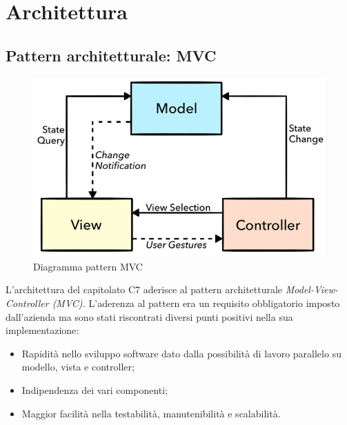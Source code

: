 \section{Architettura}
\subsection{Pattern architetturale: MVC}
\begin{figure}[H]
    \centering
    \includegraphics[scale = 1]{components/img/mvc-generico.png}
    \caption{Diagramma pattern MVC}
    \label{fig:diagramma MVC generico}
\end{figure}
L'architettura del capitolato C7 aderisce al pattern architetturale \textit{Model-View-Controller (MVC).} L'aderenza al pattern era un requisito obbligatorio imposto dall'azienda ma sono stati riscontrati diversi punti positivi nella sua implementazione:

\begin{itemize}
    \item Rapidità nello sviluppo software dato dalla possibilità di lavoro parallelo su modello, vista e controller;
    \item Indipendenza dei vari componenti;
    \item Maggior facilità nella testabilità, manutenibilità e scalabilità.
\end{itemize}

